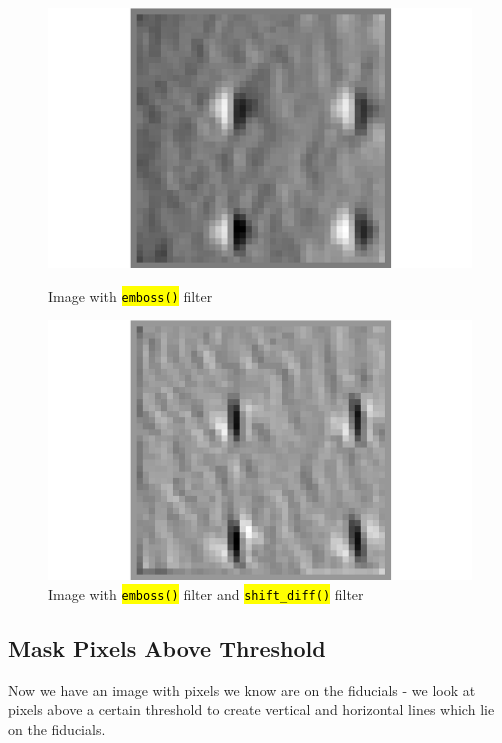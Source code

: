 \documentclass[10pt]{article}
\begin{document}
    \begin{figure}[h]
        \begin{minipage}{0.4\textwidth}
            \begin{center}
                \includegraphics[width=.75\linewidth]{plots_tables_images/emboss.png}
                \caption{Image with \hl{\texttt{emboss()}} filter}
            \end{center}
        \end{minipage}
        \begin{minipage}{0.4\textwidth}
            \begin{center}
                \includegraphics[width=.75\linewidth]{plots_tables_images/shiftdiff.png}
                \caption{Image with \hl{\texttt{emboss()}} filter and \hl{\texttt{shift\_diff()}} filter}
            \end{center}
        \end{minipage}
    \end{figure}

    \subsection{Mask Pixels Above Threshold} %
    \label{sub:mask_pixels_above_threshold}
    Now we have an image with pixels we know are on the fiducials - we look at pixels above a certain threshold to create vertical and horizontal lines which lie on the fiducials. 
\end{document}
